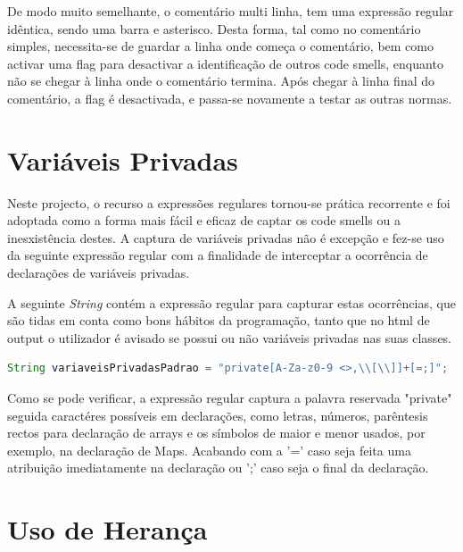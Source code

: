 De modo muito semelhante, o comentário multi linha, tem uma expressão regular idêntica, sendo uma barra e asterisco. Desta forma, tal como no comentário simples, necessita-se de guardar a linha onde começa o comentário, bem como activar uma flag para desactivar a identificação de outros code smells, enquanto não se chegar à linha onde o comentário termina. Após chegar à linha final do comentário, a flag é desactivada, e passa-se novamente a testar as outras normas.

\section{Variáveis Privadas}

\hspace{5mm} Neste projecto, o recurso a expressões regulares tornou-se prática recorrente e foi adoptada como a forma mais fácil e eficaz de captar os code smells ou a inesxistência destes. A captura de variáveis privadas não é excepção e fez-se uso da seguinte expressão regular com a finalidade de interceptar a ocorrência de declarações de variáveis privadas.
\par A seguinte \textit{String} contém a expressão regular para capturar estas ocorrências, que são tidas em conta como bons hábitos da programação, tanto que no html de output o utilizador é avisado se possui ou não variáveis privadas nas suas classes.

\vspace{0.5cm}

\begin{lstlisting}[language=Java]  
String variaveisPrivadasPadrao = "private[A-Za-z0-9 <>,\\[\\]]+[=;]";
\end{lstlisting}

\vspace{0.5cm}

\par Como se pode verificar, a expressão regular captura a palavra reservada "private" seguida caractéres possíveis em declarações, como letras, números, parêntesis rectos para declaração de arrays e os símbolos de maior e menor usados, por exemplo, na declaração de Maps. Acabando com a '=' caso seja feita uma atribuição imediatamente na declaração ou ';' caso seja o final da declaração.

\section{Uso de Herança}

